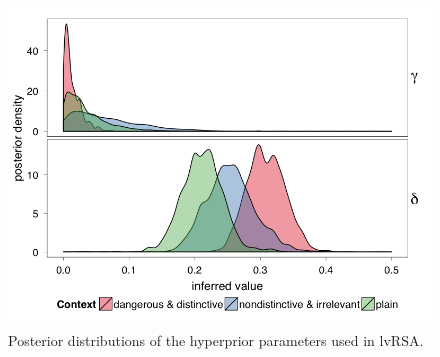 \documentclass[10pt,letterpaper]{article}
\begin{document}
%
%
%
%
%
\begin{figure}
\vspace{-16pt}
  \begin{center}
    \includegraphics[width=0.48\columnwidth]{inferred_hyperpriors}
  \end{center}
  \caption{Posterior distributions of the hyperprior parameters used in lvRSA.}
   \label{fig:posthyper}
\end{figure}
\end{document}

